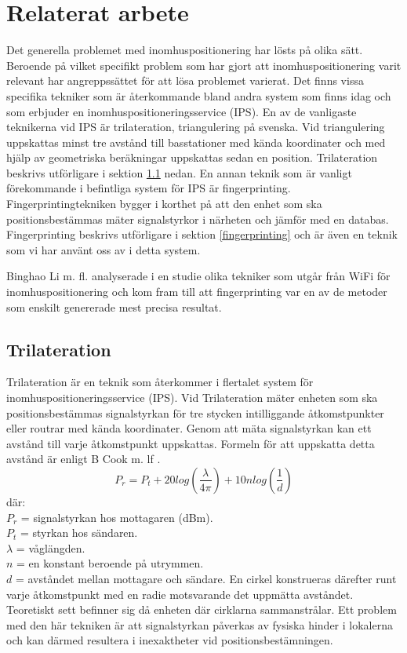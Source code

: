\documentclass[a4paper,12pt]{article}
\begin{document}
 \section{Relaterat arbete}
 Det generella problemet med inomhuspositionering har lösts på olika sätt.
 Beroende på vilket specifikt problem som har gjort att inomhuspositionering varit relevant har angreppssättet för att lösa problemet varierat. Det finns vissa specifika tekniker som är återkommande bland andra system som finns idag och som erbjuder en inomhuspositioneringsservice (IPS)\cite{IP1}.
 En av de vanligaste teknikerna vid IPS är trilateration\cite{cook2005indoor}, triangulering på svenska. Vid triangulering uppskattas minst tre avstånd till basstationer med kända koordinater och med hjälp av geometriska beräkningar uppskattas sedan en position. Trilateration beskrivs utförligare i sektion \ref{triangulering}
  nedan. En annan teknik som är vanligt förekommande i befintliga system för IPS är fingerprinting\cite{IP1}\cite{jun2018low}. Fingerprintingtekniken bygger i korthet på att den enhet som ska positionsbestämmas mäter signalstyrkor i närheten och jämför med en databas. Fingerprinting beskrivs utförligare i sektion \ref{fingerprinting} och är även en teknik som vi har använt oss av i detta system.

 Binghao Li m. fl. analyserade i en studie \cite{IP1} olika tekniker som utgår från WiFi för inomhuspositionering och kom fram till att fingerprinting var en av de metoder som enskilt genererade mest precisa resultat.


 \subsection{Trilateration}\label{triangulering}
 Trilateration är en teknik som återkommer i flertalet system för inomhuspositioneringsservice (IPS). Vid Trilateration mäter enheten som ska positionsbestämmas signalstyrkan för tre stycken intilliggande åtkomstpunkter eller routrar med kända koordinater. Genom att mäta signalstyrkan kan ett avstånd till varje åtkomstpunkt uppskattas. Formeln för att uppskatta detta avstånd är enligt B Cook m. lf \cite{cook2005indoor}.
 \newline
 $$ P_r = P_t + 20log(\frac{\lambda}{4\pi}) + 10nlog(\frac{1}{d})$$
 där:\\
 $  P_r $ = signalstyrkan hos mottagaren (dBm).\\
 $P_t$ = styrkan hos sändaren.\\
 $\lambda$ = våglängden.\\
 $ n $ = en konstant beroende på utrymmen.\\
 $ d $ = avståndet mellan mottagare och sändare.
 \bigskip
 \newline
 En cirkel konstrueras därefter runt varje åtkomstpunkt med en radie motsvarande det uppmätta avståndet. Teoretiskt sett befinner sig då enheten där cirklarna sammanstrålar. Ett problem med den här tekniken är att signalstyrkan påverkas av fysiska hinder i lokalerna och kan därmed resultera i inexaktheter vid positionsbestämningen.
\end{document}
